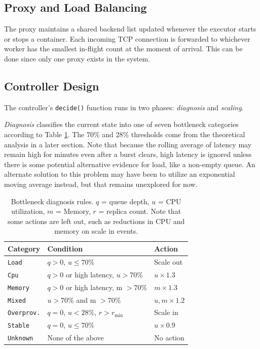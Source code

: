 \documentclass[twocolumn]{article}
\begin{document}
\subsection{Proxy and Load Balancing}
\label{sec:org74dfeda}

The proxy maintains a shared backend list updated whenever the executor starts or stops a container. Each incoming TCP connection is forwarded to whichever worker has the smallest in-flight count at the moment of arrival. This can be done since only one proxy exists in the system.
\subsection{Controller Design}
\label{sec:orgb171207}

The controller's \texttt{decide()} function runs in two phases: \emph{diagnosis} and \emph{scaling}.

\emph{Diagnosis} classifies the current state into one of seven bottleneck categories according to Table \ref{tab:diagnosis}. The 70\% and 28\% thresholds come from the theoretical analysis in a later section. Note that because the rolling average of latency may remain high for minutes even after a burst clears, high latency is ignored unless there is some potential alternative evidence for load, like a non-empty queue. An alternate solution to this problem may have been to utilize an exponential moving average instead, but that remains unexplored for now.

\begin{table}[htbp]
\caption{\label{tab:diagnosis}Bottleneck diagnosis rules. \(q\) = queue depth, \(u\) = CPU utilization, \(m\) = Memory, \(r\) = replica count. Note that some actions are left out, such as reductions in CPU and memory on scale in events.}
\centering
\small
\begin{tabular}{lll}
\toprule
Category & Condition & Action\\
\midrule
\texttt{Load} & \(q > 0\), \(u \le 70\%\) & Scale out\\
\texttt{Cpu} & \(q > 0\) or high latency, \(u > 70\%\) & \(u \times 1.3\)\\
\texttt{Memory} & \(q > 0\) or high latency, m \(> 70\%\) & \(m \times 1.3\)\\
\texttt{Mixed} & \(u > 70\%\) and m \(> 70\%\) & \(u, m \times 1.2\)\\
\texttt{Overprov.} & \(q=0\), \(u < 28\%\), \(r > r_{\min}\) & Scale in\\
\texttt{Stable} & \(q=0\), \(u \le 70\%\) & \(u \times 0.9\)\\
\texttt{Unknown} & None of the above & No action\\
\bottomrule
\end{tabular}
\end{table}
\end{document}
